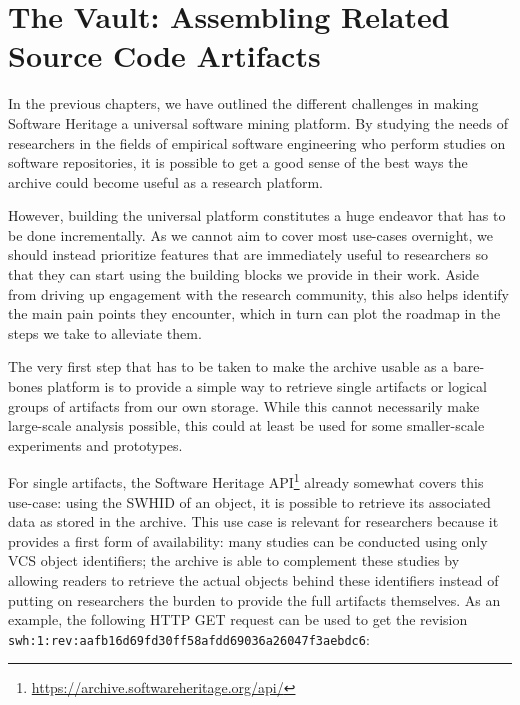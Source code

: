 \chapter{The Vault: Assembling Related Source Code Artifacts}%
\label{chp:vault}

In the previous chapters, we have outlined the different challenges in making
Software Heritage a universal software mining platform. By studying the needs
of researchers in the fields of empirical software engineering who perform
studies on software repositories, it is possible to get a good sense of the
best ways the archive could become useful as a research platform.

However, building the universal platform constitutes a huge endeavor that has
to be done incrementally. As we cannot aim to cover most use-cases overnight,
we should instead prioritize features that are immediately useful to
researchers so that they can start using the building blocks we provide in
their work. Aside from driving up engagement with the research community, this
also helps identify the main pain points they encounter, which in turn can
plot the roadmap in the steps we take to alleviate them.

The very first step that has to be taken to make the archive usable as a
bare-bones platform is to provide a simple way to retrieve single artifacts or
logical groups of artifacts from our own storage. While this cannot necessarily
make large-scale analysis possible, this could at least be used for some
smaller-scale experiments and prototypes.

For single artifacts, the Software Heritage
API\footnote{\url{https://archive.softwareheritage.org/api/}} already somewhat
covers this use-case: using the \gls{SWHID} of an object, it is possible to
retrieve its associated data as stored in the archive. This use case is
relevant for researchers because it provides a first form of availability: many
studies can be conducted using only \gls{VCS} object identifiers; the archive
is able to complement these studies by allowing readers to retrieve the actual
objects behind these identifiers instead of putting on researchers the burden
to provide the full artifacts themselves.
As an example, the following HTTP GET request can be used to get the revision
\texttt{swh:1:rev:aafb16d69fd30ff58afdd69036a26047f3aebdc6}:

\vspace{1em}

